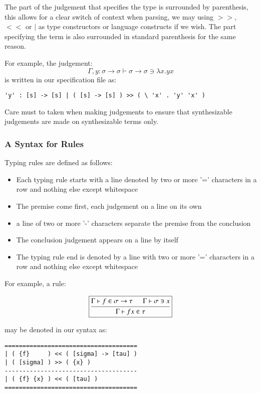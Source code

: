 {The part of the judgement that specifies the type is surrounded by
parenthesis, this allows for a clear switch of context when parsing, we
may using $>>$, $<<$ or $\vert$ as type constructors or language constructs if
we wish. The part specifying the term is also surrounded in standard
parenthesis for the same reason.

For example, the judgement:
$$\Gamma, y : \sigma \to \sigma \vdash \sigma \to \sigma \ni \lambda x
. y x$$
is written in our specification file as:
\begin{center}
\begin{BVerbatim}
'y' : [s] -> [s] | ( [s] -> [s] ) >> ( \ 'x' . 'y' 'x' )
\end{BVerbatim}
\end{center}

Care must to taken when making judgements to ensure that synthesizable
judgements are made on synthesizable terms only.

\subsubsection{A Syntax for Rules}

Typing rules are defined as follows:
\begin{itemize}
  \item Each typing rule starts with a line denoted by two or more '='
    characters in a row and nothing else except whitespace
  \item The premise come first, each judgement on a line on its own
  \item a line of two or more '-' characters separate the premise from
    the conclusion
  \item The conclusion judgement appears on a line by itself
  \item The typing rule end is denoted by a line with two or more '='
    characters in a row and nothing else except whitespace
\end{itemize}

For example, a rule:

$$\boxed{
\mbox{\begin {prooftree}
    \hypo{\Gamma \vdash f \in \sigma \to \tau}
    \hypo{\Gamma \vdash \sigma \ni x}
  \infer2[]{\Gamma \vdash f x \in \tau}
\end {prooftree}}
}$$

may be denoted in our syntax as:

\begin{center}
\begin{BVerbatim}
=====================================
| ( {f}     ) << ( [sigma] -> [tau] )
| ( [sigma] ) >> ( {x} )
-------------------------------------
| ( {f} {x} ) << ( [tau] )
=====================================
\end{BVerbatim}
\end{center}

}
